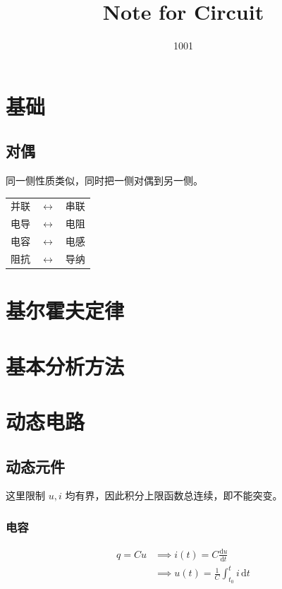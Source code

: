 \documentclass[12pt, a4paper, UTF8, openany]{ctexbook}
\title{Note for Circuit}
\author{1001}
\newcommand{\dif}{\mathrm{d}}
\newcommand{\dift}{\,\dif t}
\begin{document}
    \maketitle

    \tableofcontents %
    \cleardoublepage %

    \chapter{基础}
    \section{对偶}
    同一侧性质类似，同时把一侧对偶到另一侧。
    \begin{longtable}[h]{ccc}
        并联 & $\leftrightarrow$ & 串联 \\
        电导 & $\leftrightarrow$ & 电阻 \\
        电容 & $\leftrightarrow$ & 电感 \\
        阻抗 & $\leftrightarrow$ & 导纳
    \end{longtable}

    \chapter{基尔霍夫定律}

    \chapter{基本分析方法}

    \chapter{动态电路}
    \section{动态元件}
    这里限制 $u, i$ 均有界，因此积分上限函数总连续，即不能突变。

        \subsection{电容}
        $$\begin{aligned}
            q = Cu & \implies \boxed{i(t) = C \frac{\dif u}{\dif t}} \\
            & \implies u(t) = \frac{1}{C} \int_{t_0}^{t} i \dift
        \end{aligned}$$
\end{document}
